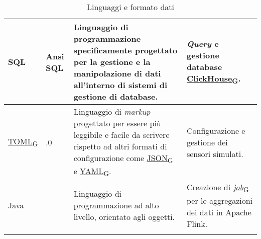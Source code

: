\begin{longtable}{|>{\centering\arraybackslash}m{}|>{\centering\arraybackslash}m{}|>{\centering\arraybackslash}m{}|>{\centering\arraybackslash}m{}|}
	SQL           & Ansi SQL          & Linguaggio di programmazione specificamente progettato per la gestione e la manipolazione di dati all'interno di sistemi di gestione di database.    & \textit{Query} e gestione database \href{https://7last.github.io/docs/pb/documentazione-interna/glossario\#clickhouse}{ClickHouse\textsubscript{G}}.                                                                               \\\hline
	\href{https://7last.github.io/docs/pb/documentazione-interna/glossario\#tom's-obvious-minimal-language}{TOML\textsubscript{G}}          & 1.0.0             & Linguaggio di \textit{markup} progettato per essere più leggibile e facile da scrivere rispetto ad altri formati di configurazione come \href{https://7last.github.io/docs/pb/documentazione-interna/glossario\#javascript-object-notation}{JSON\textsubscript{G}} e \href{https://7last.github.io/docs/pb/documentazione-interna/glossario\#yet-another-markup-language}{YAML\textsubscript{G}}. & Configurazione e gestione dei sensori simulati.                                                                              \\\hline
	Java          & 17                & Linguaggio di programmazione ad alto livello, orientato agli oggetti.                                                                                & Creazione di \href{https://7last.github.io/docs/pb/documentazione-interna/glossario\#job}{\textit{job}\textsubscript{G}} per le aggregazioni dei dati in Apache Flink.                                                      \\\hline
	\caption{Linguaggi e formato dati}
\end{longtable}

